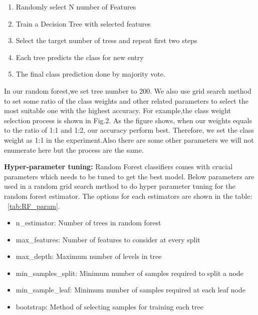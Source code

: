 \begin{enumerate}
    \item Randomly select N number of Features
    \item Train a Decision Tree with selected features
    \item Select the target number of tress and repeat first two steps 
    \item Each tree predicts the class for new entry
    \item The final class prediction done by majority vote. 
\end{enumerate}

In our random forest,we set tree number to 200. We also use grid search method to set some ratio of the class weights and other related parameters to select the most suitable one with the highest accuracy. For example,the class weight selection process is shown in Fig.2. As the figure shows, when our weights equals to the ratio of 1:1 and 1:2, our accuracy perform best. Therefore, we set the class weight as 1:1 in the experiment.Also there are some other parameters we will not enumerate here but the process are the same. 



\textbf{Hyper-parameter tuning:}
Random Forest classifiers comes with crucial parameters which needs to be tuned to get the best model. Below parameters are used in a random grid search method to do hyper parameter tuning for the random forest estimator. The options for each estimators are shown in the table: ~\ref{tab:RF_param}.
\begin{itemize}
    \item n\_estimator: Number of trees in random forest
    \item max\_features: Number of features to consider at every split
    \item max\_depth: Maximum number of levels in tree
    \item min\_samples\_split: Minimum number of samples required to split a node
    \item min\_sample\_leaf: Minimum number of samples required at each leaf node
    \item bootstrap: Method of selecting samples for training each tree
\end{itemize}

